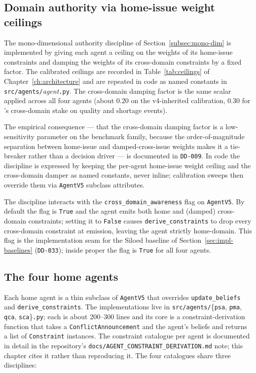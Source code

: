 \subsection{Domain authority via home-issue weight ceilings}
\label{subsec:impl-ceilings}

The mono-dimensional authority discipline of
Section~\ref{subsec:mono-dim} is implemented by giving each agent a
ceiling on the weights of its home-issue constraints and damping the
weights of its cross-domain constraints by a fixed factor. The
calibrated ceilings are recorded in Table~\ref{tab:ceilings} of
Chapter~\ref{ch:architecture} and are repeated in code as named
constants in \texttt{src/agents/}\textit{agent}\texttt{.py}. The
cross-domain damping factor is the same scalar applied across all four
agents (about $0.20$ on the v4-inherited calibration, $0.30$ for
\PSA{}'s cross-domain stake on quality and shortage events).

The empirical consequence --- that the cross-domain damping factor is a
low-sensitivity parameter on the benchmark family, because the
order-of-magnitude separation between home-issue and damped-cross-issue
weights makes it a tie-breaker rather than a decision driver --- is
documented in \texttt{DD-009}. In code the discipline is expressed by
keeping the per-agent home-issue weight ceiling and the cross-domain
damper as named constants, never inline; calibration sweeps then
override them via \texttt{AgentV5} subclass attributes.

The discipline interacts with the \texttt{cross\_domain\_awareness}
flag on \texttt{AgentV5}. By default the flag is \texttt{True} and the
agent emits both home and (damped) cross-domain constraints; setting it
to \texttt{False} causes \texttt{derive\_constraints} to drop every
cross-domain constraint at emission, leaving the agent strictly
home-domain. This flag is the implementation seam for the Siloed
baseline of Section~\ref{sec:impl-baselines} (\texttt{DD-033}); inside
\NEXUS{} proper the flag is \texttt{True} for all four agents.

\subsection{The four home agents}

Each home agent is a thin subclass of \texttt{AgentV5} that overrides
\texttt{update\_beliefs} and \texttt{derive\_constraints}. The
implementations live in \texttt{src/agents/}\{\texttt{psa}, \texttt{pma},
\texttt{qca}, \texttt{sca}\}\texttt{.py}; each is about 200--300 lines and
its core is a constraint-derivation function that takes a
\texttt{ConflictAnnouncement} and the agent's beliefs and returns a
list of \texttt{Constraint} instances. The constraint catalogue per
agent is documented in detail in the repository's
\texttt{docs/AGENT\_CONSTRAINT\_DERIVATION.md} note; this chapter cites
it rather than reproducing it. The four catalogues share three
disciplines:

